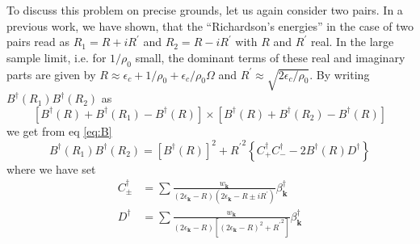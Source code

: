 \documentclass[aps,prb,superscriptaddress,showpacs,reprint,lengthcheck]{revtex4-1}
\newcommand{\vk}{\ensuremath{\mathbf{k}}}
\begin{document}
To discuss this problem on precise grounds, let us again consider two pairs. In
a previous work\cite{combescotBCS}, we have shown, that the ``Richardson's
energies'' in the case of two pairs read as $R_1=R+iR^{\prime}$ and $R_2=R-i{}R^{\prime}$ with $R$
and $R^{\prime}$ real. In the
large sample limit, i.e. for $1/\rho_0$ small,  the dominant terms of these real and imaginary parts are given by $R\approx\epsilon_c+1/%
\rho_0+\epsilon_c/\rho_0\Omega$ and $R^{\prime}\approx\sqrt{2\epsilon_c/\rho_0}$. By writing $B^{\dagger}(R_1)B^{\dagger}(R_2)$ as 
\begin{equation}
\left[B^{\dagger}(R)+B^{\dagger}(R_1)-B^{\dagger}(R)\right]\times \left[%
B^{\dagger}(R)+B^{\dagger}(R_2)-B^{\dagger}(R)\right] 
\end{equation}
we get from eq \eqref{eq:B} 
\begin{equation}
B^{\dagger}(R_1)B^{\dagger}(R_2)=\left[B^{\dagger}(R)\right]
^2+{R^{\prime}}^2\left\{C^{\dagger}_+C^{\dagger}_--2B^{\dagger}(R)D^{\dagger}%
\right\} 
\end{equation}
where we have set 
\begin{align}
C^{\dagger}_{\pm}&=\sum\frac{w_\vk}{\left(2\epsilon_\vk-R\right)
\left(2\epsilon_\vk-R\pm{}iR^{\prime}\right) }\beta^{\dagger}_\vk \\
D^{\dagger}&=\sum\frac{w_\vk}{\left(2\epsilon_\vk-R\right) \left[%
\left(2\epsilon_\vk-R\right) ^2+{}{R^{\prime}}^2\right] }\beta^{\dagger}_\vk
\end{align}
\end{document}
